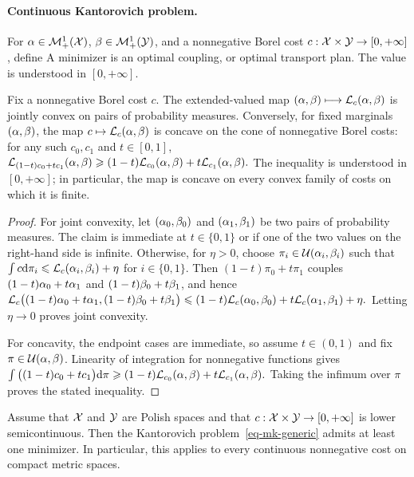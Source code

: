\paragraph{Continuous Kantorovich problem.}
\begin{defn}\label{def-continuous-kantorovich-problem}
For $\alpha\in\mathcal{M}_+^1(\mathcal{X})$, $\beta\in\mathcal{M}_+^1(\mathcal{Y})$, and a nonnegative Borel cost $c:\mathcal{X}\times\mathcal{Y}\to[0,+\infty]$, define
A minimizer is an optimal coupling, or optimal transport plan.
The value is understood in $[0,+\infty]$.
\end{defn}
\begin{prop}\label{prop-kantorovich-value-curvature}
Fix a nonnegative Borel cost $c$. The extended-valued map
\((\alpha,\beta)\longmapsto\mathcal{L}_c(\alpha,\beta)\)
is jointly convex on pairs of probability measures. Conversely, for fixed marginals $(\alpha,\beta)$, the map $c\mapsto\mathcal{L}_c(\alpha,\beta)$ is concave on the cone of nonnegative Borel costs: for any such $c_0,c_1$ and $t\in[0,1]$,
\(\mathcal{L}_{(1-t)c_0+tc_1}(\alpha,\beta) \geqslant (1-t)\mathcal{L}_{c_0}(\alpha,\beta)+t\mathcal{L}_{c_1}(\alpha,\beta).\)
The inequality is understood in $[0,+\infty]$; in particular, the map is concave on every convex family of costs on which it is finite.
\end{prop}
\begin{proof}
For joint convexity, let $(\alpha_0,\beta_0)$ and $(\alpha_1,\beta_1)$ be two pairs of probability measures. The claim is immediate at $t\in\{0,1\}$ or if one of the two values on the right-hand side is infinite. Otherwise, for $\eta>0$, choose $\pi_i\in\mathcal{U}(\alpha_i,\beta_i)$ such that $\int c\mathrm{d}\pi_i\leqslant\mathcal{L}_c(\alpha_i,\beta_i)+\eta$ for $i\in\{0,1\}$.
Then $(1-t)\pi_0+t\pi_1$ couples $(1-t)\alpha_0+t\alpha_1$ and $(1-t)\beta_0+t\beta_1$, and hence
\(\mathcal{L}_c\big((1-t)\alpha_0+t\alpha_1,(1-t)\beta_0+t\beta_1\big) \leqslant (1-t)\mathcal{L}_c(\alpha_0,\beta_0)+t\mathcal{L}_c(\alpha_1,\beta_1)+\eta.\)
Letting $\eta\to0$ proves joint convexity.

For concavity, the endpoint cases are immediate, so assume $t\in(0,1)$ and fix $\pi\in\mathcal{U}(\alpha,\beta)$. Linearity of integration for nonnegative functions gives
\(\int\big((1-t)c_0+tc_1\big)\mathrm{d}\pi \geqslant (1-t)\mathcal{L}_{c_0}(\alpha,\beta)+t\mathcal{L}_{c_1}(\alpha,\beta).\)
Taking the infimum over $\pi$ proves the stated inequality.
\end{proof}
\begin{prop}\label{prop-kantorovich-existence-compact}
Assume that $\mathcal{X}$ and $\mathcal{Y}$ are Polish spaces and that $c:\mathcal{X}\times\mathcal{Y}\to[0,+\infty]$ is lower semicontinuous. Then the Kantorovich problem~\eqref{eq-mk-generic} admits at least one minimizer. In particular, this applies to every continuous nonnegative cost on compact metric spaces.
\end{prop}
